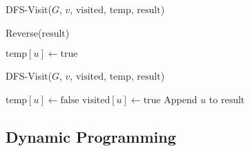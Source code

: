 \documentclass[a4paper,10pt]{article}
\begin{document}
\begin{flushleft}
\begin{algorithm}
\begin{algorithmic}[1]
			\State DFS-Visit($G$, $v$, $\text{visited}$, $\text{temp}$, $\text{result}$)
			\EndIf
			\EndFor

			\State \Return Reverse($\text{result}$)

			\State $\text{temp}[u] \gets \text{true}$ 

			\State DFS-Visit($G$, $v$, $\text{visited}$, $\text{temp}$, $\text{result}$)
			\EndFor

			\State $\text{temp}[u] \gets \text{false}$ 
			\State $\text{visited}[u] \gets \text{true}$ 
			\State Append $u$ to $\text{result}$
			\EndFunction
		\end{algorithmic}
	\end{algorithm}
	\subsection{Dynamic Programming}
\end{flushleft}
\end{document}
